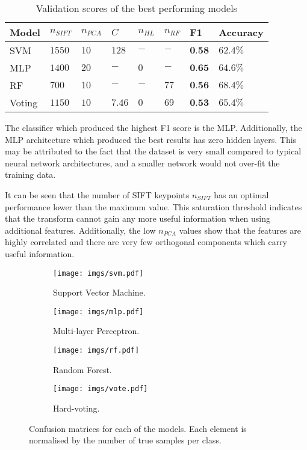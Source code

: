 \documentclass{IEEEtran}
\newcommand{\nsift}{\ensuremath{n_{SIFT}}}
\newcommand{\npca}{\ensuremath{n_{PCA}}}
\newcommand{\nhl}{\ensuremath{n_{HL}}}
\newcommand{\nrf}{\ensuremath{n_{RF}}}
\begin{document}
	\begin{table}[t!]
		\centering
		\caption{Validation scores of the best performing models}
		\label{tbl:results}
		\begin{tabular}{llllllll}
			\hline
			Model  & $\nsift$ & $\npca$ & $C$      & $\nhl$ & $\nrf$ & F1                & Accuracy    \\ \hline
			SVM    & $ 1550 $ & $ 10 $  & $ 128 $  & $ - $  & $ - $  & $ \textbf{0.58} $ & $ 62.4 \% $ \\
			MLP    & $ 1400 $ & $ 20 $  & $ - $    & $ 0 $  & $ - $  & $ \textbf{0.65} $ & $ 64.6 \% $ \\
			RF     & $ 700 $  & $ 10 $  & $ - $    & $ - $  & $ 77 $ & $ \textbf{0.56} $ & $ 68.4 \% $ \\
			Voting & $ 1150 $ & $ 10 $  & $ 7.46 $ & $ 0 $  & $ 69 $ & $ \textbf{0.53} $ & $ 65.4 \% $ \\ \hline
		\end{tabular}
	\end{table}
	
	The classifier which produced the highest F1 score is the MLP. Additionally, the MLP architecture which produced the best results has zero hidden layers. This may be attributed to the fact that the dataset is very small compared to typical neural network architectures, and a smaller network would not over-fit the training data.
	
	It can be seen that the number of SIFT keypoints $\nsift$ has an optimal performance lower than the maximum value. This saturation threshold indicates that the transform cannot gain any more useful information when using additional features. Additionally, the low $\npca$ values show that the features are highly correlated and there are very few orthogonal components which carry useful information.  
	
	\begin{figure} [b!]
		\centering
		\begin{subfigure}[b]{0.49\linewidth}
			\centering
			\texttt{[image: imgs/svm.pdf]}
			\caption{Support Vector Machine.}
			\label{fig:svm}
		\end{subfigure}
		\hfill
		\begin{subfigure}[b]{0.49\linewidth}
			\centering
			\texttt{[image: imgs/mlp.pdf]}
			\caption{Multi-layer Perceptron.}
			\label{fig:mlp}
		\end{subfigure}
		\hfill
		\begin{subfigure}[b]{0.49\linewidth}
			\centering
			\texttt{[image: imgs/rf.pdf]}
			\caption{Random Forest.}
			\label{fig:rf}
		\end{subfigure}
		\hfill
		\begin{subfigure}[b]{0.49\linewidth}
			\centering
			\texttt{[image: imgs/vote.pdf]}
			\caption{Hard-voting.}
			\label{fig:vote}
		\end{subfigure}
		\caption{Confusion matrices for each of the models. Each element is normalised by the number of true samples per class.}
		\label{fig:confusion}
	\end{figure}
	
\end{document}
